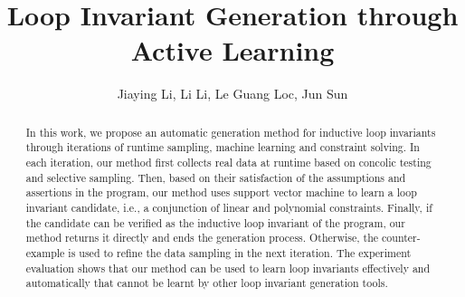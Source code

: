 \documentclass{llncs}
\begin{document}
\title{Loop Invariant Generation through Active Learning}
\author{
Jiaying Li, Li Li, Le Guang Loc, Jun Sun\\
}

\maketitle

\begin{abstract}
    In this work, we propose an automatic generation method for inductive loop invariants 
    through iterations of runtime sampling, machine learning and constraint solving. 
    In each iteration, our method first collects real data at runtime 
    based on concolic testing and selective sampling. 
    Then, based on their satisfaction of the assumptions and assertions in the program, 
    our method uses support vector machine to learn a loop invariant candidate, 
    i.e., a conjunction of linear and polynomial constraints. 
    Finally, if the candidate can be verified as the inductive loop invariant of the program, 
    our method returns it directly and ends the generation process. 
    Otherwise, the counter-example is used to refine the data sampling in the next iteration. 
    The experiment evaluation shows that our method can be used to learn loop invariants 
    effectively and automatically that cannot be learnt by other loop invariant generation tools. 
\end{abstract}












\end{document}
